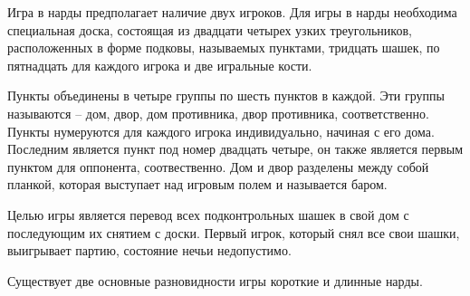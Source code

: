 Игра в нарды предполагает наличие двух игроков. Для игры в нарды необходима специальная доска, состоящая из двадцати четырех узких треугольников, расположенных в форме подковы, называемых пунктами, тридцать шашек, по пятнадцать для каждого игрока и две игральные кости.

Пункты объединены в четыре группы по шесть пунктов в каждой. Эти группы называются -- дом, двор, дом противника, двор противника, соответственно. Пункты нумеруются для каждого игрока индивидуально, начиная с его дома. Последним является пункт под номер двадцать четыре, он также является первым пунктом для оппонента, соотвественно. Дом и двор разделены между собой планкой, которая выступает над игровым полем и называется баром.

Целью игры является перевод всех подконтрольных шашек в свой дом с последующим их снятием с доски. Первый игрок, который снял все свои шашки, выигрывает партию, состояние нечьи недопустимо.

Существует две основные разновидности игры короткие и длинные нарды.
